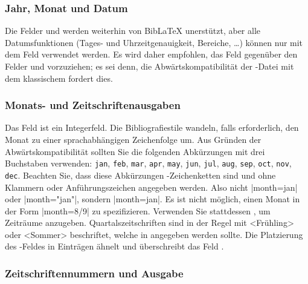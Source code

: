 \documentclass{ltxdockit}[2011/03/25]
\newcommand*{\biblatex}{BibLaTeX\xspace}
\begin{document}
\subsubsection{Jahr, Monat und Datum}
\label{bib:use:yearordate}

Die Felder  und  werden weiterhin von \biblatex
unerstützt, aber alle Datumsfunktionen (Tages- und Uhrzeitgenauigkeit, Bereiche,
\ldots) können nur mit dem Feld  verwendet werden. Es wird 
daher empfohlen,
das Feld  gegenüber den Felder  und 
vorzuziehen; es sei denn, die Abwärtskompatibilität der -Datei mit dem
klassischem \bibtex fordert dies.

\subsubsection{Monats- und Zeitschriftenausgaben} \label{bib:use:iss} 

Das Feld
 ist ein Integerfeld. Die Bibliografiestile wandeln, falls
erforderlich, den Monat zu einer sprachabhängigen Zeichenfolge um. Aus Gründen
der Abwärtskompatibilität sollten Sie die folgenden Abkürzungen mit drei
Buchstaben verwenden: \texttt{jan}, \texttt{feb}, \texttt{mar}, \texttt{apr},
\texttt{may}, \texttt{jun}, \texttt{jul}, \texttt{aug}, \texttt{sep},
\texttt{oct}, \texttt{nov}, \texttt{dec}. Beachten Sie, dass diese Abkürzungen
\bibtex-Zeichenketten sind und ohne Klammern oder Anführungszeichen angegeben
werden. Also nicht |month={jan}| oder |month="jan"|, sondern |month=jan|. Es ist
nicht möglich, einen Monat in der Form |month={8/9}| zu spezifizieren. Verwenden
Sie stattdessen , um Zeiträume anzugeben. Quartalszeitschriften
sind in der Regel mit <Frühling> oder <Sommer> beschriftet, welche in
 angegeben werden sollte. Die Platzierung des
-Feldes in  Einträgen ähnelt und überschreibt
das Feld .

\subsubsection{Zeitschriftennummern und Ausgabe} \label{bib:use:issnum}
\end{document}
